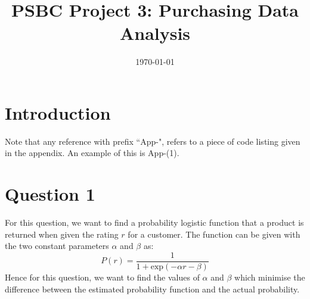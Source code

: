 \documentclass[12pt]{article}
\title{PSBC Project 3: Purchasing Data Analysis}
\date{\today}
\author{} %
\renewcommand{\exp}[1]{\text{exp}\left(#1\right)}
\begin{document}
\maketitle

\section*{Introduction}
Note that any reference with prefix ``App-", refers to a piece of code listing given in the appendix. An example of this is App-(1).

\section{Question 1}
For this question, we want to find a probability logistic function that a product is returned when given the rating $r$ for a customer. The function can be given with the two constant parameters $\alpha$ and $\beta$ as:
\begin{equation*}
  P(r) = \frac{1}{1+\exp{-\alpha r - \beta}}
\end{equation*}
Hence for this question, we want to find the values of $\alpha$ and $\beta$ which minimise the difference between the estimated probability function and the actual probability.
\end{document}
